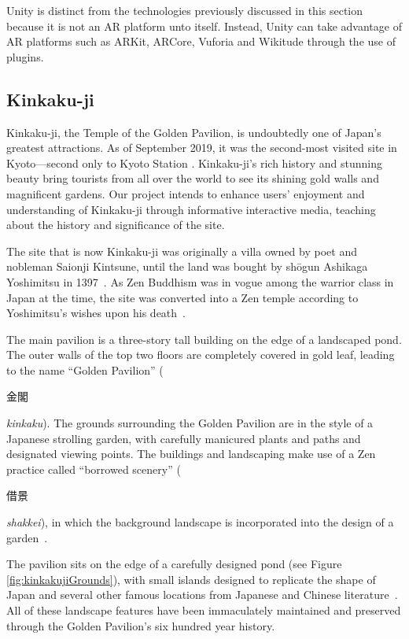\documentclass[a4paper, 10pt, american, titlepage]{article}
\begin{document}
Unity is distinct from the technologies previously discussed in this section
because it is not an AR platform unto itself. Instead, Unity can take advantage
of AR platforms such as ARKit, ARCore, Vuforia and Wikitude through the use of
plugins.

\subsection{Kinkaku-ji}
\label{sec:kinkaku-ji}

Kinkaku-ji, the Temple of the Golden Pavilion, is undoubtedly one of Japan's
greatest attractions.  As of September 2019, it was the second-most visited site
in Kyoto---second only to Kyoto Station \autocite{japanguide2019}. Kinkaku-ji's
rich history and stunning beauty bring tourists from all over the world to see
its shining gold walls and magnificent gardens. Our project intends to enhance
users' enjoyment and understanding of Kinkaku-ji through informative interactive
media, teaching about the history and significance of the site.

The site that is now Kinkaku-ji was originally a villa owned by poet and
nobleman Saionji Kintsune, until the land was bought by shōgun Ashikaga
Yoshimitsu in 1397~\autocite{noboru2013}. As Zen Buddhism was in vogue among the
warrior class in Japan at the time, the site was converted into a Zen temple
according to Yoshimitsu's wishes upon his death~\autocite{bornoff2000}.

The main pavilion is a three-story tall building on the edge of a landscaped
pond. The outer walls of the top two floors are completely covered in gold leaf,
leading to the name ``Golden Pavilion'' (\begin{CJK}{UTF8}{min}金閣\end{CJK}
\textit{kinkaku}). The grounds surrounding the Golden Pavilion are in the style
of a Japanese strolling garden, with carefully manicured plants and paths and
designated viewing points. The buildings and landscaping make use of a Zen
practice called ``borrowed scenery'' (\begin{CJK}{UTF8}{min}借景\end{CJK}
\textit{shakkei}), in which the background landscape is incorporated into the
design of a garden~\autocite{noboru2013}.

The pavilion sits on the edge of a carefully designed pond (see Figure
\ref{fig:kinkakujiGrounds}), with small islands designed to replicate the shape
of Japan and several other famous locations from Japanese and Chinese
literature~\autocite{young2007}. All of these landscape features have been
immaculately maintained and preserved through the Golden Pavilion's six hundred
year history.
\end{document}
